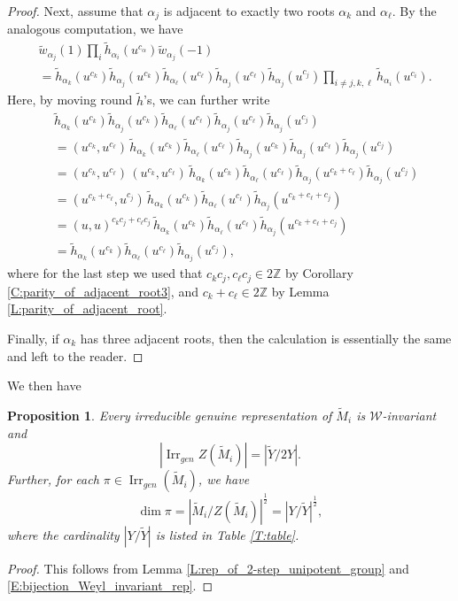 \documentclass[10pt, letterpaper]{amsart}
\theoremstyle{plain}
\newtheorem{Prop}[equation]{Proposition}
\theoremstyle{definition}
\numberwithin{equation}{section}
\newcommand{\Z}{\mathbb{Z}}
\newcommand{\wt}{\tilde{w}}
\newcommand{\htt}{\tilde{h}}
\newcommand{\Mt}{\widetilde{M}}
\newcommand{\Yt}{\widetilde{Y}}
\newcommand{\Irr}{\operatorname{Irr}}
\newcommand{\Wcal}{\mathcal{W}}
\begin{document}
\begin{proof}
Next, assume that $\alpha_j$ is adjacent to exactly two roots $\alpha_k$ and $\alpha_\ell$. By the analogous computation, we have
\begin{align*}
&\wt_{\alpha_j}(1) \prod_{i}\htt_{\alpha_i}(u^{c_\alpha}) \wt_{\alpha_j}(-1)\\
&=\htt_{\alpha_k}(u^{c_k})\htt_{\alpha_j}(u^{c_k})\htt_{\alpha_\ell}(u^{c_\ell})\htt_{\alpha_j}(u^{c_\ell})\htt_{\alpha_j}(u^{c_j})\prod_{i\neq j, k, \ell}\htt_{\alpha_i}(u^{c_i}).
\end{align*}
Here, by moving round $\htt$'s, we can further write
\begin{align*}
&\htt_{\alpha_k}(u^{c_k})\htt_{\alpha_j}(u^{c_k})\htt_{\alpha_\ell}(u^{c_\ell})\htt_{\alpha_j}(u^{c_\ell})\htt_{\alpha_j}(u^{c_j})\\
&=(u^{c_k},u^{c_{\ell}})\,\htt_{\alpha_k}(u^{c_k})\htt_{\alpha_\ell}(u^{c_\ell})\htt_{\alpha_j}(u^{c_k})\htt_{\alpha_j}(u^{c_\ell})\htt_{\alpha_j}(u^{c_j})\\
&=(u^{c_k},u^{c_{\ell}})\,(u^{c_k},u^{c_{\ell}})\,\htt_{\alpha_k}(u^{c_k})\htt_{\alpha_\ell}(u^{c_\ell})\htt_{\alpha_j}(u^{c_k+c_\ell})\htt_{\alpha_j}(u^{c_j})\\
&=(u^{c_k+c_\ell}, u^{c_j})\,\htt_{\alpha_k}(u^{c_k})\htt_{\alpha_\ell}(u^{c_\ell})\htt_{\alpha_j}(u^{c_k+c_\ell+c_j})\\\
&=(u,u)^{c_kc_j+c_\ell c_j}\,\htt_{\alpha_k}(u^{c_k})\htt_{\alpha_\ell}(u^{c_\ell})\htt_{\alpha_j}(u^{c_k+c_\ell+c_j})\\
&=\htt_{\alpha_k}(u^{c_k})\htt_{\alpha_\ell}(u^{c_\ell})\htt_{\alpha_j}(u^{c_j}),
\end{align*}
where for the last step we used that $c_kc_j, c_\ell c_j\in 2\Z$ by Corollary \ref{C:parity_of_adjacent_root3}, and $c_k+c_\ell\in 2\Z$ by Lemma \ref{L:parity_of_adjacent_root}.

Finally, if $\alpha_k$ has three adjacent roots, then the calculation is essentially the same and left to the reader.
\end{proof}

We then have
\begin{Prop}\label{P:W-invariant_rep_of_Mt}
Every irreducible genuine representation of $\Mt_i$ is $\Wcal$-invariant and 
\[
\left|\Irr_{gen}Z(\Mt_i)\right|=\left|\Yt\slash 2Y\right|.
\]
Further, for each $\pi\in \Irr_{gen}(\Mt_i)$, we have
\[
\dim\pi=\left|\Mt_i\slash Z(\Mt_i)\right|^{\frac{1}{2}}=\left|Y\slash\Yt\right|^{\frac{1}{2}},
\]
where the cardinality $\left|Y\slash\Yt\right|$ is listed in Table \ref{T:table}.
\end{Prop}
\begin{proof}
This follows from Lemma \ref{L:rep_of_2-step_unipotent_group} and \eqref{E:bijection_Weyl_invariant_rep}.
\end{proof}
\end{document}
